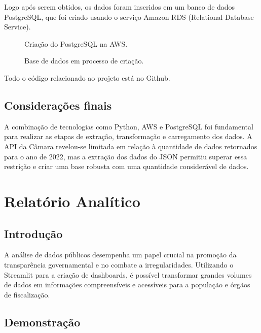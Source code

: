\documentclass[12pt, a4paper]{article}
\begin{document}
Logo após serem obtidos, os dados foram inseridos em um banco de dados PostgreSQL, que foi criado usando o serviço Amazon RDS (Relational Database Service).

\begin{figure}[h]
    \centering
    \framebox[0.8\textwidth]{\rule{0pt}{4cm}}
    \caption{Criação do PostgreSQL na AWS.}
    \label{fig:criacao_postgresql}
\end{figure}

\begin{figure}[h]
    \centering
    \caption{Base de dados em processo de criação.}
    \label{fig:bd_criacao}
\end{figure}

Todo o código relacionado ao projeto está no Github\cite{github_repo}.

\subsection{Considerações finais}

A combinação de tecnologias como Python, AWS e PostgreSQL foi fundamental para realizar as etapas de extração, transformação e carregamento dos dados. A API da Câmara revelou-se limitada em relação à quantidade de dados retornados para o ano de 2022, mas a extração dos dados do JSON permitiu superar essa restrição e criar uma base robusta com uma quantidade considerável de dados.

\section{Relatório Analítico}

\subsection{Introdução}

A análise de dados públicos desempenha um papel crucial na promoção da transparência governamental e no combate a irregularidades. Utilizando o Streamlit para a criação de dashboards, é possível transformar grandes volumes de dados em informações compreensíveis e acessíveis para a população e órgãos de fiscalização.

\subsection{Demonstração}
\end{document}
